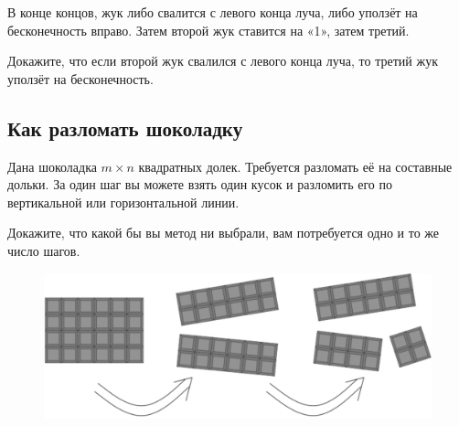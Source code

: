 В конце концов, жук либо свалится с левого конца луча, либо уползёт на бесконечность вправо.
Затем второй жук ставится на «1», затем третий.

Докажите, что если второй жук свалился с левого конца луча, то третий жук уползёт на бесконечность.

\subsection*{Как разломать шоколадку}%

Дана шоколадка $m\times n$ квадратных долек. 
Требуется разломать её на составные дольки.
За один шаг вы можете взять один кусок и разломить его по вертикальной или горизонтальной линии.

Докажите, что какой бы вы метод ни выбрали, вам потребуется одно и то же  число шагов.

\begin{figure}[h!]
\centering
\includegraphics[scale=0.5]{Figs/Algorithms/bar}
\end{figure}
